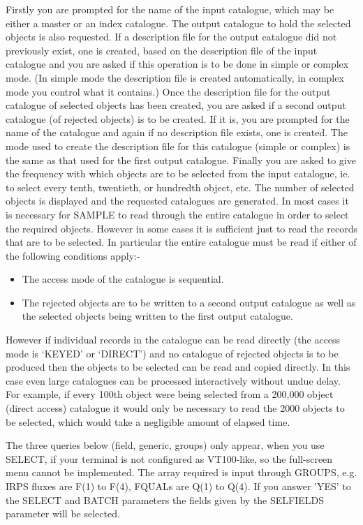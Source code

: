 Firstly you are prompted for the name of the input catalogue, which may 
be either a master or an index catalogue. 
The output catalogue to hold the selected objects is also requested. 
If a description file for the output catalogue did not previously exist,
one is created, based on the description file of the input catalogue and 
you are asked if this operation is to be done in simple or complex mode. 
(In simple mode the description file is created automatically, in complex 
mode you control what it contains.)
Once the description file for the output catalogue of selected objects has 
been created, you are asked if a second output catalogue (of rejected 
objects) is to be created. 
If it is, you are prompted for the name of the catalogue and again if 
no description file exists, one is created. 
The mode used to create the description file for this catalogue (simple or 
complex) is the same as that used for the first output catalogue.
Finally you are asked to give the frequency with which objects are to 
be selected from the input catalogue, ie. to select every tenth, twentieth, 
or hundredth object, etc. 
The number of selected objects is displayed and the requested catalogues 
are generated.
In most cases it is necessary for SAMPLE to read through the entire catalogue 
in order to select the required objects. 
However in some cases it is sufficient just to read the records that are
to be selected. 
In particular the entire catalogue must be read if either of the following 
conditions apply:-
\begin{itemize}
\item The access mode of the catalogue is sequential.
\item The rejected objects are to be written to a second output
     catalogue as well as the selected objects being written to
     the first output catalogue.
\end{itemize}
However if individual records in the catalogue can be read directly (the 
access mode is `KEYED' or `DIRECT') and no catalogue of rejected objects 
is to be produced then the objects to be selected can be read and copied 
directly. 
In this case even large catalogues can be processed interactively without 
undue delay. 
For example, if every 100th object were being selected from a 200,000 object
(direct access) catalogue it would only be necessary to read the 2000 objects 
to be selected, which would take a negligible amount of elapsed time.

The three queries below (field, generic, groups) only appear, when you use
SELECT, if your terminal is not configured as VT100-like, so the full-screen 
menu cannot be implemented.
The array required is input through GROUPS, e.g. IRPS fluxes are F(1) to 
F(4), FQUALs are Q(1) to Q(4).
If you answer 'YES' to the SELECT and BATCH parameters the fields given by the
SELFIELDS parameter will be selected.

